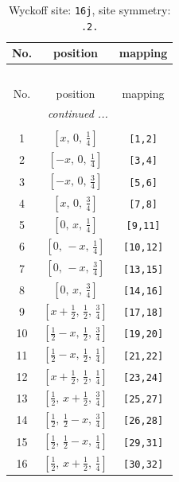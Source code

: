 \documentclass[fleqn,8pt]{jsarticle}
\begin{document}
\renewcommand{\arraystretch}{1.2}
\begin{longtable}{ccc}
\caption{Wyckoff site: {\tt 16j}, site symmetry: {\tt .2.}}
 \\
 \hline \hline
No. & position & mapping \\ \hline \endfirsthead

\multicolumn{2}{l}{\tablename\ \thetable{}} \\
 \hline \hline
No. & position & mapping \\ \hline \endhead

 \hline \hline
\multicolumn{2}{r}{\footnotesize\it continued ...} \\ \endfoot

 \hline \hline
\multicolumn{2}{r}{} \\ \endlastfoot

1 & $\left[ x,\, 0,\, \frac{1}{4} \right]$ & {\tt [1,2]} \\ \hline
2 & $\left[ - x,\, 0,\, \frac{1}{4} \right]$ & {\tt [3,4]} \\ \hline
3 & $\left[ - x,\, 0,\, \frac{3}{4} \right]$ & {\tt [5,6]} \\ \hline
4 & $\left[ x,\, 0,\, \frac{3}{4} \right]$ & {\tt [7,8]} \\ \hline
5 & $\left[ 0,\, x,\, \frac{1}{4} \right]$ & {\tt [9,11]} \\ \hline
6 & $\left[ 0,\, - x,\, \frac{1}{4} \right]$ & {\tt [10,12]} \\ \hline
7 & $\left[ 0,\, - x,\, \frac{3}{4} \right]$ & {\tt [13,15]} \\ \hline
8 & $\left[ 0,\, x,\, \frac{3}{4} \right]$ & {\tt [14,16]} \\ \hline
9 & $\left[ x + \frac{1}{2},\, \frac{1}{2},\, \frac{3}{4} \right]$ & {\tt [17,18]} \\ \hline
10 & $\left[ \frac{1}{2} - x,\, \frac{1}{2},\, \frac{3}{4} \right]$ & {\tt [19,20]} \\ \hline
11 & $\left[ \frac{1}{2} - x,\, \frac{1}{2},\, \frac{1}{4} \right]$ & {\tt [21,22]} \\ \hline
12 & $\left[ x + \frac{1}{2},\, \frac{1}{2},\, \frac{1}{4} \right]$ & {\tt [23,24]} \\ \hline
13 & $\left[ \frac{1}{2},\, x + \frac{1}{2},\, \frac{3}{4} \right]$ & {\tt [25,27]} \\ \hline
14 & $\left[ \frac{1}{2},\, \frac{1}{2} - x,\, \frac{3}{4} \right]$ & {\tt [26,28]} \\ \hline
15 & $\left[ \frac{1}{2},\, \frac{1}{2} - x,\, \frac{1}{4} \right]$ & {\tt [29,31]} \\ \hline
16 & $\left[ \frac{1}{2},\, x + \frac{1}{2},\, \frac{1}{4} \right]$ & {\tt [30,32]} \\
\end{longtable}
\end{document}
